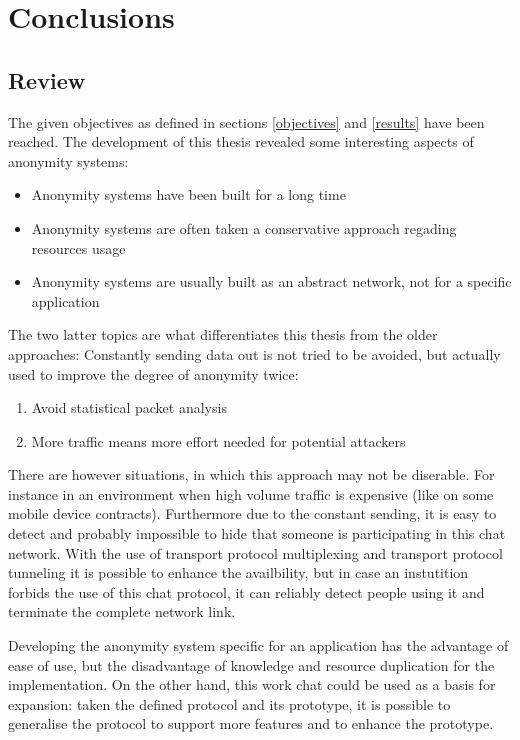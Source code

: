 \chapter{Conclusions}
\section{Review}
The given objectives as defined in sections
\ref{objectives} and \ref{results} have been reached. 
The development of this thesis revealed some interesting aspects
of anonymity systems:
\begin{itemize}
\item Anonymity systems have been built for a long time
\item Anonymity systems are often taken a conservative approach regading resources usage
\item Anonymity systems are usually built as an abstract network, not for a specific application
\end{itemize}
The two latter topics are what differentiates this thesis from the older
approaches: Constantly sending data out is not tried to be avoided, but
actually used to improve the degree of anonymity twice:
\begin{enumerate}
\item Avoid statistical packet analysis
\item More traffic means more effort needed for potential attackers
\end{enumerate}
There are however situations, in which this approach may not be diserable.
For instance in an environment when high volume traffic is expensive
(like on some mobile device contracts).
Furthermore due to the constant sending, it is easy to detect and probably
impossible to hide that someone is participating in this chat network.
With the use of transport protocol multiplexing and transport protocol
tunneling it is possible to enhance the availbility, but in case an
instutition forbids the use of this chat protocol, it can reliably
detect people using it and terminate the complete network link.

Developing the anonymity system specific for an application has the advantage
of ease of use, but the disadvantage of knowledge and resource duplication
for the implementation. On the other hand, this work
chat could be used as a basis for expansion: taken the
defined protocol and its prototype, it is possible to generalise
the protocol to support more features and to enhance the prototype.
